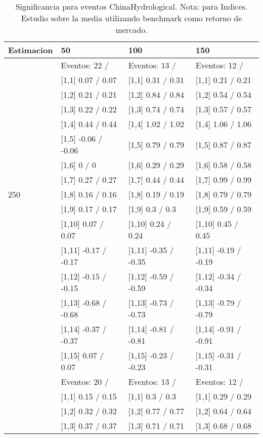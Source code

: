 \begin{table}

\caption{Significancia para eventos ChinaHydrological. Nota: para Indices. Estudio sobre la media utilizando benchmark como retorno de mercado.}
\centering
\begin{tabular}[t]{llll}
\toprule
Estimacion & 50 & 100 & 150\\
\midrule
 & Eventos:  22 / & Eventos:  13 / & Eventos:  12 /\\
 & {}[1,1] 0.07  / 0.07 & {}[1,1] 0.31  / 0.31 & {}[1,1] 0.21  / 0.21\\
 & {}[1,2] 0.21  / 0.21 & {}[1,2] 0.84  / 0.84 & {}[1,2] 0.54  / 0.54\\
 & {}[1,3] 0.22  / 0.22 & {}[1,3] 0.74  / 0.74 & {}[1,3] 0.57  / 0.57\\
 & {}[1,4] 0.44  / 0.44 & {}[1,4] 1.02  / 1.02 & {}[1,4] 1.06  / 1.06\\
\addlinespace
 & {}[1,5] -0.06  / -0.06 & {}[1,5] 0.79  / 0.79 & {}[1,5] 0.87  / 0.87\\
 & {}[1,6] 0  / 0 & {}[1,6] 0.29  / 0.29 & {}[1,6] 0.58  / 0.58\\
 & {}[1,7] 0.27  / 0.27 & {}[1,7] 0.44  / 0.44 & {}[1,7] 0.99  / 0.99\\
250 & {}[1,8] 0.16  / 0.16 & {}[1,8] 0.19  / 0.19 & {}[1,8] 0.79  / 0.79\\
 & {}[1,9] 0.17  / 0.17 & {}[1,9] 0.3  / 0.3 & {}[1,9] 0.59  / 0.59\\
\addlinespace
 & {}[1,10] 0.07  / 0.07 & {}[1,10] 0.24  / 0.24 & {}[1,10] 0.45  / 0.45\\
 & {}[1,11] -0.17  / -0.17 & {}[1,11] -0.35  / -0.35 & {}[1,11] -0.19  / -0.19\\
 & {}[1,12] -0.15  / -0.15 & {}[1,12] -0.59  / -0.59 & {}[1,12] -0.34  / -0.34\\
 & {}[1,13] -0.68  / -0.68 & {}[1,13] -0.73  / -0.73 & {}[1,13] -0.79  / -0.79\\
 & {}[1,14] -0.37  / -0.37 & {}[1,14] -0.81  / -0.81 & {}[1,14] -0.91  / -0.91\\
\addlinespace
 & {}[1,15] 0.07  / 0.07 & {}[1,15] -0.23  / -0.23 & {}[1,15] -0.31  / -0.31\\
 & Eventos:  20 / & Eventos:  13 / & Eventos:  12 /\\
 & {}[1,1] 0.15  / 0.15 & {}[1,1] 0.3  / 0.3 & {}[1,1] 0.29  / 0.29\\
 & {}[1,2] 0.32  / 0.32 & {}[1,2] 0.77  / 0.77 & {}[1,2] 0.64  / 0.64\\
 & {}[1,3] 0.37  / 0.37 & {}[1,3] 0.71  / 0.71 & {}[1,3] 0.68  / 0.68\\

\end{tabular}
\end{table}
